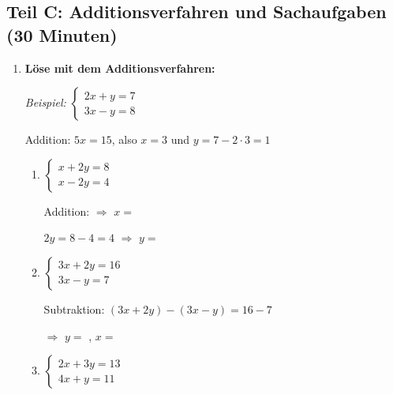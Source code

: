 \subsection*{Teil C: Additionsverfahren und Sachaufgaben (30 Minuten)}

\begin{enumerate}[label=\arabic*., resume]

    \item \textbf{Löse mit dem Additionsverfahren:}
    \vspace{0.5cm}

    \textit{Beispiel:} $\begin{cases} 2x + y = 7 \\ 3x - y = 8 \end{cases}$

    Addition: $5x = 15$, also $x = 3$ und $y = 7 - 2 \cdot 3 = 1$

    \begin{enumerate}[label=\alph*)]
        \item $\begin{cases} x + 2y = 8 \\ x - 2y = 4 \end{cases}$

        Addition: \underline{\hspace{6cm}} $\Rightarrow$ $x =$ \underline{\hspace{1cm}}

        $2y = 8 - 4 = 4$ $\Rightarrow$ $y =$ \underline{\hspace{1cm}}

        \vspace{0.5cm}
        \item $\begin{cases} 3x + 2y = 16 \\ 3x - y = 7 \end{cases}$

        Subtraktion: $(3x + 2y) - (3x - y) = 16 - 7$

        \underline{\hspace{6cm}} $\Rightarrow$ $y =$ \underline{\hspace{1cm}}, $x =$ \underline{\hspace{1cm}}

        \vspace{0.5cm}
        \item $\begin{cases} 2x + 3y = 13 \\ 4x + y = 11 \end{cases}$


\end{enumerate}
\end{enumerate}
